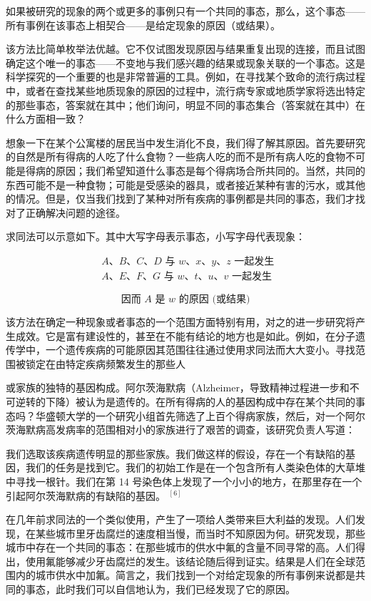 如果被研究的现象的两个或更多的事例只有一个共同的事态，那么，这个事态——所有事例在该事态上相契合——是给定现象的原因（或结果）。

该方法比简单枚举法优越。它不仅试图发现原因与结果重复出现的连接，而且试图确定这个唯一的事态——不变地与我们感兴趣的结果或现象关联的一个事态。这是科学探究的一个重要的也是非常普遍的工具。例如，在寻找某个致命的流行病过程中，或者在查找某些地质现象的原因的过程中，流行病专家或地质学家将选出特定的那些事态，答案就在其中；他们询问，明显不同的事态集合（答案就在其中）在什么方面相一致？

想象一下在某个公寓楼的居民当中发生消化不良，我们得了解其原因。首先要研究的自然是所有得病的人吃了什么食物？一些病人吃的而不是所有病人吃的食物不可能是得病的原因；我们希望知道什么事态是每个得病场合所共同的。当然，共同的东西可能不是一种食物；可能是受感染的器具，或者接近某种有害的污水，或其他的情况。但是，仅当我们找到了某种对所有疾病的事例都是共同的事态，我们才找对了正确解决问题的途径。

求同法可以示意如下。其中大写字母表示事态，小写字母代表现象：

$$
\begin{aligned}
& A 、 B 、 C 、 D \text { 与 } w 、 x 、 y 、 z \text { 一起发生 } \\
& A 、 E 、 F 、 G \text { 与 } w 、 t 、 u 、 v \text { 一起发生 }
\end{aligned}
$$

$$
\text { 因而 } A \text { 是 } w \text { 的原因 (或结果) }
$$

该方法在确定一种现象或者事态的一个范围方面特别有用，对之的进一步研究将产生成效。它是富有建设性的，甚至在不能有结论的地方也是如此。例如，在分子遗传学中，一个遗传疾病的可能原因其范围往往通过使用求同法而大大变小。寻找范围被锁定在由特定疾病频繁发生的那些人

或家族的独特的基因构成。阿尔茨海默病（Alzheimer，导致精神过程进一步和不可逆转的下降）被认为是遗传的。在所有得病的人的基因构成中存在某个共同的事态吗？华盛顿大学的一个研究小组首先筛选了上百个得病家族，然后，对一个阿尔茨海默病高发病率的范围相对小的家族进行了艰苦的调查，该研究负责人写道：

\begin{displayquote}
我们选取该疾病遗传明显的那些家族。我们做这样的假设，存在一个有缺陷的基因，我们的任务是找到它。我们的初始工作是在一个包含所有人类染色体的大草堆中寻找一根针。我们在第 14 号染色体上发现了一个小小的地方，在那里存在一个引起阿尔茨海默病的有缺陷的基因。 ${ }^{[6]}$
\end{displayquote}

在几年前求同法的一个类似使用，产生了一项给人类带来巨大利益的发现。人们发现，在某些城市里牙齿腐烂的速度相当慢，而当时不知原因为何。研究发现，那些城市中存在一个共同的事态：在那些城市的供水中氟的含量不同寻常的高。人们得出，使用氟能够减少牙齿腐烂的发生。该结论随后得到证实。结果是人们在全球范围内的城市供水中加氟。简言之，我们找到一个对给定现象的所有事例来说都是共同的事态，此时我们可以自信地认为，我们已经发现了它的原因。


